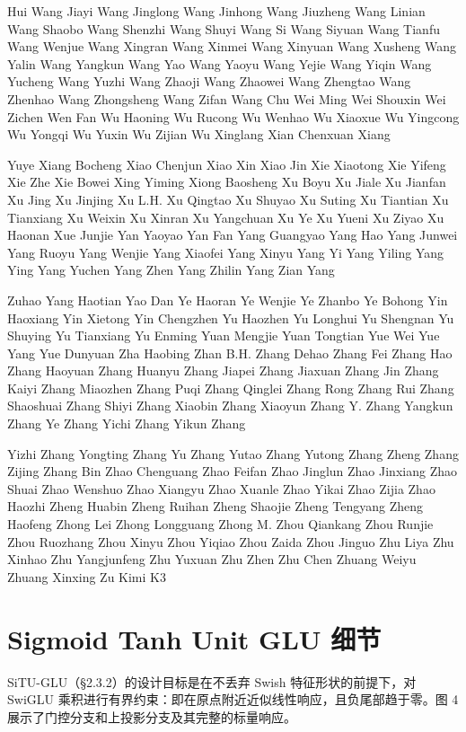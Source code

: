 \documentclass[
  10
]{article}
\begin{document}
Hui Wang Jiayi Wang Jinglong Wang Jinhong Wang Jiuzheng Wang Linian Wang
Shaobo Wang Shenzhi Wang Shuyi Wang Si Wang Siyuan Wang Tianfu Wang
Wenjue Wang Xingran Wang Xinmei Wang Xinyuan Wang Xusheng Wang Yalin
Wang Yangkun Wang Yao Wang Yaoyu Wang Yejie Wang Yiqin Wang Yucheng Wang
Yuzhi Wang Zhaoji Wang Zhaowei Wang Zhengtao Wang Zhenhao Wang
Zhongsheng Wang Zifan Wang Chu Wei Ming Wei Shouxin Wei Zichen Wen Fan
Wu Haoning Wu Rucong Wu Wenhao Wu Xiaoxue Wu Yingcong Wu Yongqi Wu Yuxin
Wu Zijian Wu Xinglang Xian Chenxuan Xiang

Yuye Xiang Bocheng Xiao Chenjun Xiao Xin Xiao Jin Xie Xiaotong Xie
Yifeng Xie Zhe Xie Bowei Xing Yiming Xiong Baosheng Xu Boyu Xu Jiale Xu
Jianfan Xu Jing Xu Jinjing Xu L.H. Xu Qingtao Xu Shuyao Xu Suting Xu
Tiantian Xu Tianxiang Xu Weixin Xu Xinran Xu Yangchuan Xu Ye Xu Yueni Xu
Ziyao Xu Haonan Xue Junjie Yan Yaoyao Yan Fan Yang Guangyao Yang Hao
Yang Junwei Yang Ruoyu Yang Wenjie Yang Xiaofei Yang Xinyu Yang Yi Yang
Yiling Yang Ying Yang Yuchen Yang Zhen Yang Zhilin Yang Zian Yang

Zuhao Yang Haotian Yao Dan Ye Haoran Ye Wenjie Ye Zhanbo Ye Bohong Yin
Haoxiang Yin Xietong Yin Chengzhen Yu Haozhen Yu Longhui Yu Shengnan Yu
Shuying Yu Tianxiang Yu Enming Yuan Mengjie Yuan Tongtian Yue Wei Yue
Yang Yue Dunyuan Zha Haobing Zhan B.H. Zhang Dehao Zhang Fei Zhang Hao
Zhang Haoyuan Zhang Huanyu Zhang Jiapei Zhang Jiaxuan Zhang Jin Zhang
Kaiyi Zhang Miaozhen Zhang Puqi Zhang Qinglei Zhang Rong Zhang Rui Zhang
Shaoshuai Zhang Shiyi Zhang Xiaobin Zhang Xiaoyun Zhang Y. Zhang Yangkun
Zhang Ye Zhang Yichi Zhang Yikun Zhang

Yizhi Zhang Yongting Zhang Yu Zhang Yutao Zhang Yutong Zhang Zheng Zhang
Zijing Zhang Bin Zhao Chenguang Zhao Feifan Zhao Jinglun Zhao Jinxiang
Zhao Shuai Zhao Wenshuo Zhao Xiangyu Zhao Xuanle Zhao Yikai Zhao Zijia
Zhao Haozhi Zheng Huabin Zheng Ruihan Zheng Shaojie Zheng Tengyang Zheng
Haofeng Zhong Lei Zhong Longguang Zhong M. Zhou Qiankang Zhou Runjie
Zhou Ruozhang Zhou Xinyu Zhou Yiqiao Zhou Zaida Zhou Jinguo Zhu Liya Zhu
Xinhao Zhu Yangjunfeng Zhu Yuxuan Zhu Zhen Zhu Chen Zhuang Weiyu Zhuang
Xinxing Zu Kimi K3

\section{Sigmoid Tanh Unit GLU 细节}\label{b-details-of-sigmoid-tanh-unit-glu}

SiTU-GLU（§2.3.2）的设计目标是在不丢弃 Swish 特征形状的前提下，对 SwiGLU 乘积进行有界约束：即在原点附近近似线性响应，且负尾部趋于零。图 4 展示了门控分支和上投影分支及其完整的标量响应。
\end{document}
